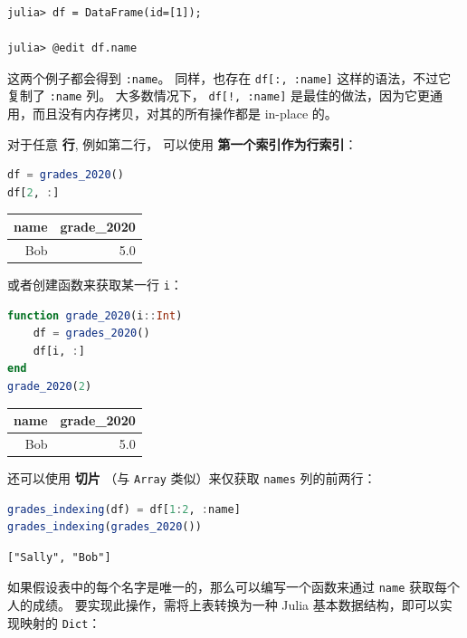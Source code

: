 \documentclass[
  notoc %
]{tufte-book}
\newcommand{\passthrough}[1]{#1}
\begin{document}
\begin{lstlisting}
julia> df = DataFrame(id=[1]);

julia> @edit df.name
\end{lstlisting}

这两个例子都会得到 \passthrough{\lstinline!:name!}。 同样，也存在
\passthrough{\lstinline!df[:, :name]!} 这样的语法，不过它复制了
\passthrough{\lstinline!:name!} 列。 大多数情况下，
\passthrough{\lstinline"df[!, :name]"}
是最佳的做法，因为它更通用，而且没有内存拷贝，对其的所有操作都是
in-place 的。

对于任意 \textbf{行}, 例如第二行， 可以使用
\textbf{第一个索引作为行索引}：

\begin{lstlisting}[language=Julia]
df = grades_2020()
df[2, :]
\end{lstlisting}

\begin{longtable}[]{@{}rr@{}}
\toprule
name & grade\_2020 \\
\midrule
\endhead
Bob & 5.0 \\
\bottomrule
\end{longtable}

或者创建函数来获取某一行 \passthrough{\lstinline!i!}：

\begin{lstlisting}[language=Julia]
function grade_2020(i::Int)
    df = grades_2020()
    df[i, :]
end
grade_2020(2)
\end{lstlisting}

\begin{longtable}[]{@{}rr@{}}
\toprule
name & grade\_2020 \\
\midrule
\endhead
Bob & 5.0 \\
\bottomrule
\end{longtable}

还可以使用 \textbf{切片} （与 \passthrough{\lstinline!Array!}
类似）来仅获取 \passthrough{\lstinline!names!} 列的前两行：

\begin{lstlisting}[language=Julia]
grades_indexing(df) = df[1:2, :name]
grades_indexing(grades_2020())
\end{lstlisting}

\begin{lstlisting}[language=Output]
["Sally", "Bob"]
\end{lstlisting}

如果假设表中的每个名字是唯一的，那么可以编写一个函数来通过
\passthrough{\lstinline!name!} 获取每个人的成绩。
要实现此操作，需将上表转换为一种 Julia 基本数据结构，即可以实现映射的
\passthrough{\lstinline!Dict!}：
\end{document}
